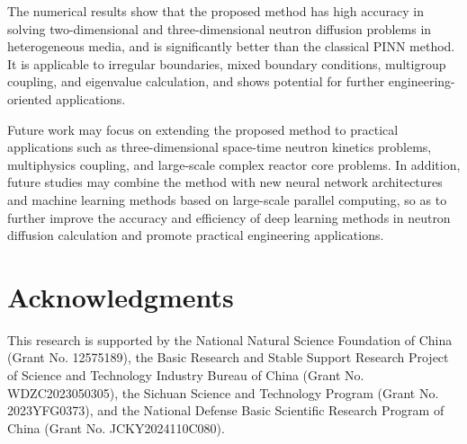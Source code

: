 \documentclass[final,3p,times,sort&compress]{elsarticle}
\begin{document}
The numerical results show that the proposed method has high accuracy in solving two-dimensional and three-dimensional neutron diffusion problems in heterogeneous media, and is significantly better than the classical PINN method. It is applicable to irregular boundaries, mixed boundary conditions, multigroup coupling, and eigenvalue calculation, and shows potential for further engineering-oriented applications.

Future work may focus on extending the proposed method to practical applications such as three-dimensional space-time neutron kinetics problems, multiphysics coupling, and large-scale complex reactor core problems. In addition, future studies may combine the method with new neural network architectures and machine learning methods based on large-scale parallel computing, so as to further improve the accuracy and efficiency of deep learning methods in neutron diffusion calculation and promote practical engineering applications.

\section*{Acknowledgments}

This research is supported by the National Natural Science Foundation of China (Grant No. 12575189), the Basic Research and Stable Support Research Project of Science and Technology Industry Bureau of China (Grant No. WDZC2023050305), the Sichuan Science and Technology Program (Grant No. 2023YFG0373), and the National Defense Basic Scientific Research Program of China (Grant No. JCKY2024110C080).



\end{document}
